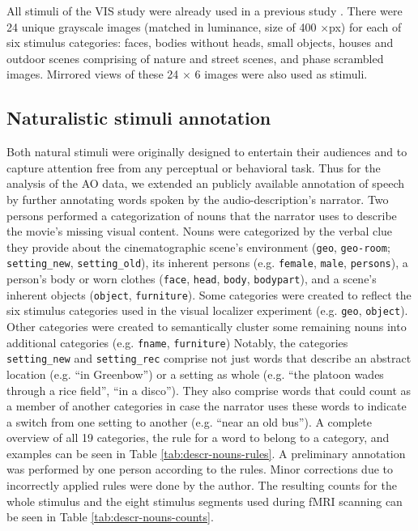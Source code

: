\documentclass[english]{article}
\begin{document}
All stimuli of the VIS study were already used in a previous study
\citep{haxby2011common}. There were 24 unique grayscale images (matched in
luminance, size of 400 $\times$\unit[400]{px}) for each of six stimulus
categories: faces, bodies without heads, small objects, houses and
outdoor scenes comprising of nature and street scenes, and phase scrambled
images. Mirrored views of these 24 $\times$ 6 images were also used as stimuli.


\subsection{Naturalistic stimuli annotation}
Both natural stimuli were originally designed to entertain their audiences and
to capture attention free from any perceptual or behavioral task.
Thus for the analysis of the AO data, we extended an publicly available
annotation of speech \citep{haeusler2020speechanno} by further annotating words
spoken by the audio-description's narrator.
Two persons performed a categorization of nouns that the narrator uses to
describe the movie's missing visual content.
Nouns were categorized by the verbal clue they provide about the cinematographic
scene's environment (\texttt{geo}, \texttt{geo-room}; \texttt{setting\_new},
\texttt{setting\_old}), its inherent persons (e.g. \texttt{female},
\texttt{male}, \texttt{persons}), a person's body or worn clothes
(\texttt{face}, \texttt{head}, \texttt{body}, \texttt{bodypart}), and a scene's
inherent objects (\texttt{object}, \texttt{furniture}).
Some categories were created to reflect the six stimulus categories used in the
visual localizer experiment (e.g. \texttt{geo}, \texttt{object}).
Other categories were created to semantically cluster some remaining nouns into
additional categories (e.g. \texttt{fname}, \texttt{furniture})
Notably, the categories \texttt{setting\_new} and \texttt{setting\_rec}
comprise not just words that describe an abstract location (e.g. ``in
Greenbow'') or a setting as whole (e.g. ``the platoon wades through a rice
field'', ``in a disco''). They also comprise words that could count as a member
of another categories in case the narrator uses these words to indicate a switch
from one setting to another (e.g. ``near an old bus'').
A complete overview of all 19 categories, the rule for a word to belong to a
category, and examples can be seen in Table \ref{tab:descr-nouns-rules}.
A preliminary annotation was performed by one person according to the rules.
Minor corrections due to incorrectly applied rules were done by the author.
The resulting counts for the whole stimulus and the eight stimulus segments used
during fMRI scanning can be seen in Table \ref{tab:descr-nouns-counts}.
\end{document}

